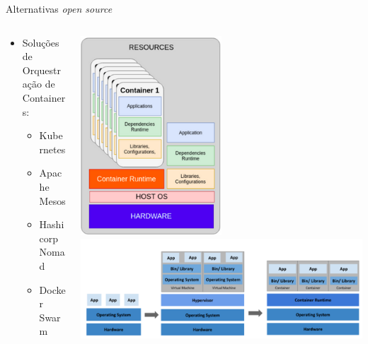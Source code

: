 \documentclass[10pt,brazil]{beamer}
\theoremstyle{definition}
\begin{document}
\begin{frame}{Alternativas \emph{open source}}
  \begin{columns}
    \begin{column}{0.5\textwidth}
      \begin{itemize}
        \item Soluções de Orquestração de Containers:
              \begin{itemize}
                \item Kubernetes\textregistered
                \item Apache Mesos\textregistered
                \item Hashicorp Nomad\textregistered\*
                \item Docker Swarm\textregistered
              \end{itemize}
      \end{itemize}
    \end{column}
    \begin{column}{0.5\textwidth}  %
      \begin{center}
        \includegraphics[width=0.5\textwidth]{containers.png}
        \includegraphics[width=1\textwidth]{vmsContainer.png}
      \end{center}
    \end{column}
  \end{columns}
\end{frame}
\end{document}

